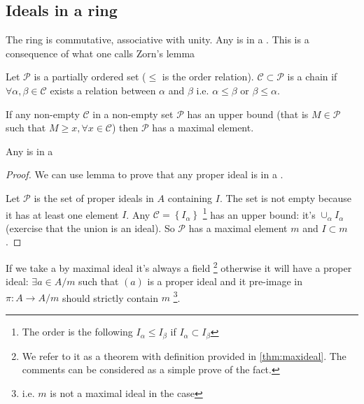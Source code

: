\subsection{Ideals in a ring}
\label{sec:lec2_ideals}
The ring is commutative, associative with unity. Any
 is in a . This is a
consequence of what one calls Zorn's lemma

\begin{definition}[Chain]
  Let $\mathcal{P}$ is a partially ordered set ($\le$ is the order
  relation). $\mathcal{C} \subset \mathcal{P}$ is a chain if
  $\forall \alpha, \beta \in \mathcal{C}$ exists a relation between
  $\alpha$ and $\beta$ i.e. $\alpha \le \beta$ or $\beta \le \alpha$.
  \label{def:chain}
\end{definition}

\begin{lemma}[Zorn]
  If any non-empty  $\mathcal{C}$ in a non-empty set
  $\mathcal{P}$ has an upper bound (that is $M \in \mathcal{P}$ such
  that $M \ge x, \forall x \in \mathcal{C}$) then $\mathcal{P}$ has a
  maximal element.
  \label{lem:zorn}
\end{lemma}

\begin{proposition}
  Any  is in a 
  \begin{proof}
    We can use  lemma to prove that any proper ideal is
    in a .
    
    Let $\mathcal{P}$ is the set of proper ideals in $A$ containing
    $I$. The set is not empty because it has at least one element $I$. Any
     $\mathcal{C} = \left\{I_\alpha\right\}$
    \footnote{
      The order is the following $I_\alpha \le I_\beta$ if
      $I_\alpha \subset I_\beta$
    }
    has an upper bound: it's $\cup_\alpha I_\alpha$ (exercise that the
    union is an ideal). So $\mathcal{P}$ has a maximal element $m$ and $I
    \subset m$.    
  \end{proof}
  \label{prop:propermaxideal}
\end{proposition}

If we take a  by maximal ideal it's always a
field
\footnote{
  We refer to it as a theorem with definition provided in
  \ref{thm:maxideal}. The comments can be considered as a simple prove
  of the fact. 
}
otherwise 
it will have a proper ideal: $\exists a \in A/m$ such that $(a)$ is a
proper ideal and it pre-image in $\pi: A \to A/m$ should strictly
contain $m$
\footnote{ i.e. $m$ is not a maximal ideal in the case}.


